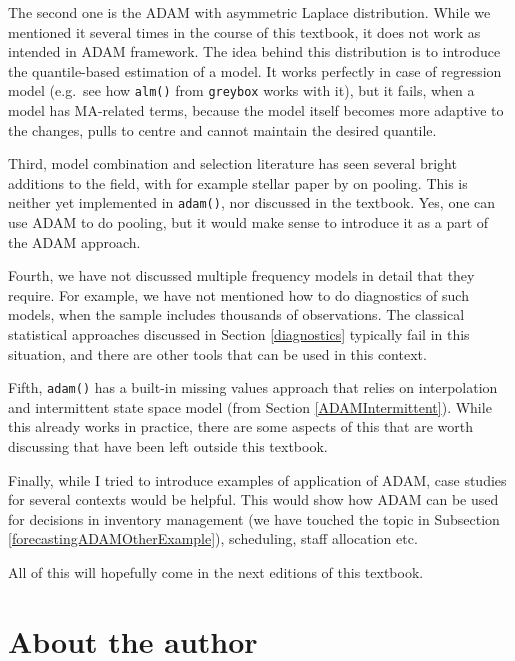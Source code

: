 \documentclass[
]{book}
\theoremstyle{definition}
\theoremstyle{definition}
\theoremstyle{definition}
\theoremstyle{definition}
\theoremstyle{remark}
\begin{document}
The second one is the ADAM with asymmetric Laplace distribution. While we mentioned it several times in the course of this textbook, it does not work as intended in ADAM framework. The idea behind this distribution is to introduce the quantile-based estimation of a model. It works perfectly in case of regression model (e.g.~see how \texttt{alm()} from \texttt{greybox} works with it), but it fails, when a model has MA-related terms, because the model itself becomes more adaptive to the changes, pulls to centre and cannot maintain the desired quantile.

Third, model combination and selection literature has seen several bright additions to the field, with for example stellar paper by \citet{Kourentzes2019c} on pooling. This is neither yet implemented in \texttt{adam()}, nor discussed in the textbook. Yes, one can use ADAM to do pooling, but it would make sense to introduce it as a part of the ADAM approach.

Fourth, we have not discussed multiple frequency models in detail that they require. For example, we have not mentioned how to do diagnostics of such models, when the sample includes thousands of observations. The classical statistical approaches discussed in Section \ref{diagnostics} typically fail in this situation, and there are other tools that can be used in this context.

Fifth, \texttt{adam()} has a built-in missing values approach that relies on interpolation and intermittent state space model (from Section \ref{ADAMIntermittent}). While this already works in practice, there are some aspects of this that are worth discussing that have been left outside this textbook.

Finally, while I tried to introduce examples of application of ADAM, case studies for several contexts would be helpful. This would show how ADAM can be used for decisions in inventory management (we have touched the topic in Subsection \ref{forecastingADAMOtherExample}), scheduling, staff allocation etc.

All of this will hopefully come in the next editions of this textbook.

\hypertarget{about-the-author}{%
\chapter*{About the author}\label{about-the-author}}
\end{document}
